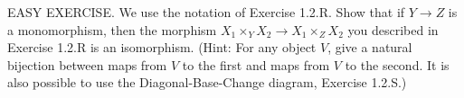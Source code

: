 EASY EXERCISE. We use the notation of Exercise 1.2.R. Show that if $Y\to Z$ is a monomorphism, then the morphism $X_1\times_YX_2\to X_1\times_ZX_2$ you described in Exercise 1.2.R is an isomorphism. (Hint: For any object $V$, give a natural bijection between maps from $V$ to the first and maps from $V$ to the second. It is also possible to use the Diagonal-Base-Change diagram, Exercise 1.2.S.)
